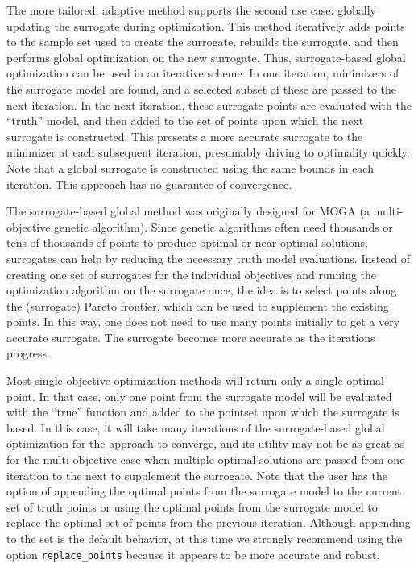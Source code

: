 The more tailored, adaptive  method
supports the second use case: globally updating the surrogate during
optimization. This method iteratively adds points to the sample set
used to create the surrogate, rebuilds the surrogate, and then
performs global optimization on the new surrogate.  Thus,
surrogate-based global optimization can be used in an iterative
scheme.  In one iteration, minimizers of the surrogate model are
found, and a selected subset of these are passed to the next
iteration.  In the next iteration, these surrogate points are
evaluated with the ``truth'' model, and then added to the set of
points upon which the next surrogate is constructed.  This presents a
more accurate surrogate to the minimizer at each subsequent iteration,
presumably driving to optimality quickly.  Note that a global
surrogate is constructed using the same bounds in each iteration.
This approach has no guarantee of convergence.

The surrogate-based global method was originally designed for MOGA (a
multi-objective genetic algorithm).  Since genetic algorithms often
need thousands or tens of thousands of points to produce optimal or
near-optimal solutions, surrogates can help by reducing the necessary
truth model evaluations.  Instead of creating one set of surrogates
for the individual objectives and running the optimization algorithm
on the surrogate once, the idea is to select points along the
(surrogate) Pareto frontier, which can be used to supplement the
existing points.  In this way, one does not need to use many points
initially to get a very accurate surrogate.  The surrogate becomes
more accurate as the iterations progress.

Most single objective optimization methods will return only a single
optimal point.  In that case, only one point from the surrogate model
will be evaluated with the ``true'' function and added to the pointset
upon which the surrogate is based.  In this case, it will take many
iterations of the surrogate-based global optimization for the approach
to converge, and its utility may not be as great as for the
multi-objective case when multiple optimal solutions are passed from
one iteration to the next to supplement the surrogate.  Note that the
user has the option of appending the optimal points from the surrogate
model to the current set of truth points or using the optimal points
from the surrogate model to replace the optimal set of points from the
previous iteration.  Although appending to the set is the default
behavior, at this time we strongly recommend using the option
\texttt{replace\_points} because it appears to be more accurate and
robust.

